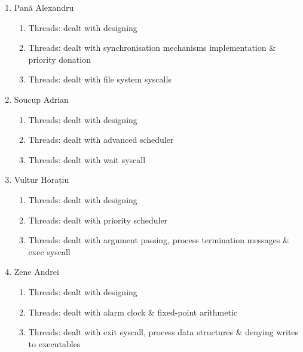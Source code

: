 \documentclass[a4paper,12pt]{report}
\begin{document}
\begin{enumerate}
	\item Pană Alexandru
	    \begin{enumerate}
	     \item Threads: dealt with designing
	     \item Threads: dealt with synchronisation mechanisms implementation \& priority donation
	     \item Threads: dealt with file system syscalls
	    \end{enumerate}

	\item Soucup Adrian
	    \begin{enumerate}
	     \item Threads: dealt with designing
	     \item Threads: dealt with advanced scheduler
	     \item Threads: dealt with wait syscall
	    \end{enumerate}
	    
	\item Vultur Horațiu
	    \begin{enumerate}
	     \item Threads: dealt with designing
	     \item Threads: dealt with priority scheduler
	     \item Threads: dealt with argument passing, process termination messages \& exec syscall
	    \end{enumerate}

	\item Zene Andrei
	    \begin{enumerate}
	     \item Threads: dealt with designing
	     \item Threads: dealt with alarm clock \& fixed-point arithmetic
	     \item Threads: dealt with exit syscall, process data structures \& denying writes to executables
	    \end{enumerate}
	   
\end{enumerate}










% 
\end{document}
